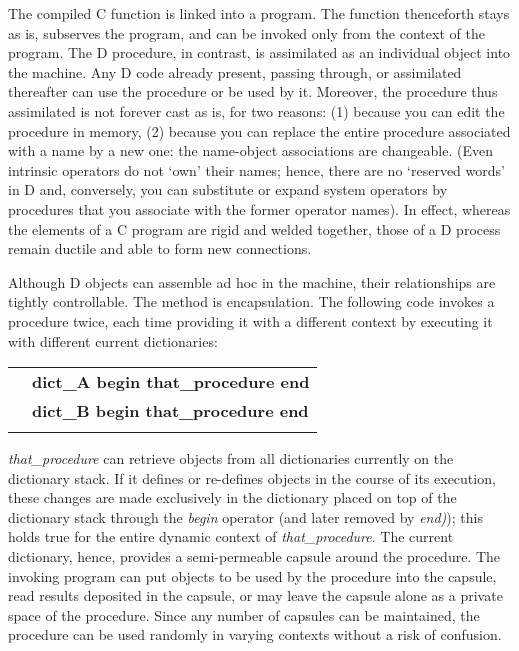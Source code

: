 The  compiled  C function is linked  into  a  program.  The  function thenceforth stays as is,  subserves the program,  and can be invoked only from  the  context of the program.  The  D  procedure,  in  contrast,  is assimilated as an individual object into the machine.  Any D code already present, passing through, or assimilated thereafter can use the procedure or be used by it. Moreover, the procedure thus assimilated is not forever cast as is, for two reasons: (1) because you can edit the procedure in memory, (2) because you can replace the entire procedure associated with a name by a new one: the name-object associations are changeable. (Even  intrinsic operators do not `own' their names;  hence, there are no `reserved words' in  D and, conversely, you can substitute or expand system operators by procedures that you associate with the former operator names).  In  effect,  whereas the elements of a C program are  rigid  and welded together, those of a D process remain ductile and able to form new connections.

Although  D  objects  can  assemble  ad  hoc  in  the   machine,   their relationships are tightly controllable.  The method is encapsulation. The following code invokes a procedure twice,  each time providing it with  a different context by executing it with different current dictionaries:\\

\begin{tabular}{>{\normalfont}l>{\sffamily\bfseries}l}
 & dict\_A begin that\_procedure end\\
 & dict\_B begin that\_procedure end\\\\
\end{tabular}

\noindent \emph{that\_procedure} can retrieve objects from all dictionaries currently  on the dictionary stack.  If it defines or re-defines objects in the  course of  its execution,  these changes are made exclusively in the  dictionary placed  on  top of the dictionary stack through the \emph{begin} operator  (and later removed by \emph{end)});  this holds true for the entire dynamic context of \emph{that\_procedure}.  The current dictionary, hence, provides a semi-permeable capsule around the procedure.  The invoking program can put objects to be used  by the procedure into the capsule,  read results deposited  in  the capsule,  or  may  leave  the capsule alone as a  private  space  of  the procedure.  Since any number of capsules can be maintained, the procedure can be used randomly in varying contexts without a risk of confusion.


